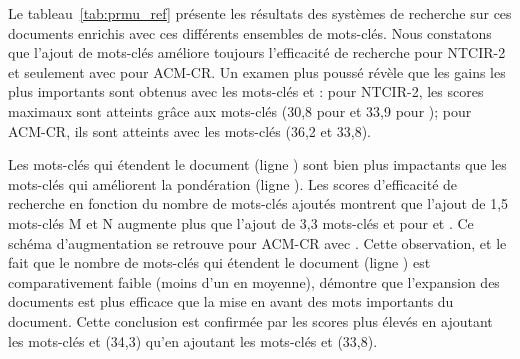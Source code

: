 Le tableau~\ref{tab:prmu_ref} présente les résultats des systèmes de recherche sur ces documents enrichis avec ces différents ensembles de mots-clés.
Nous constatons que l'ajout de mots-clés améliore toujours l'efficacité de recherche pour NTCIR-2 et seulement avec \bm{} pour ACM-CR.
Un examen plus poussé révèle que les gains les plus importants sont obtenus avec les mots-clés \mixtes{} et \nonvus{}:
pour NTCIR-2, les scores maximaux sont atteints grâce aux mots-clés \mixtes{} (30,8 pour \bm{} et 33,9 pour \bmrm{});
pour ACM-CR, ils sont atteints avec les mots-clés \nonvus{} (36,2 et 33,8).




Les mots-clés qui étendent le document (ligne ) sont bien plus impactants que les mots-clés qui améliorent la pondération (ligne ).
 Les scores d'efficacité de recherche en fonction du nombre de mots-clés ajoutés montrent que l'ajout de 1,5 mots-clés M et N augmente plus que l'ajout de 3,3 mots-clés \presents{} et \reordonnes{} pour \bm{} et \bmrm{}.
Ce schéma d'augmentation se retrouve pour ACM-CR avec \bm{}.
%
Cette observation, et le fait que le nombre de mots-clés qui étendent le document  (ligne ) est comparativement faible (moins d'un en moyenne), démontre que l'expansion des documents est plus efficace que la mise en avant des mots importants du document.
Cette conclusion est confirmée par les scores plus élevés en ajoutant les mots-clés \mixtes{} et \nonvus{} (34,3) qu'en ajoutant les mots-clés \presents{} et \reordonnes{} (33,8).

